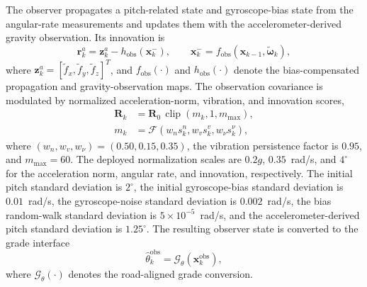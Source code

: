 \documentclass{ieeeaccess}
\begin{document}
The observer propagates a pitch-related state and gyroscope-bias state from the
angular-rate measurements and updates them with the accelerometer-derived
gravity observation. Its innovation is
\begin{equation}
\bm r_k^{a}=\bm z_k^{a}-h_{\mathrm{obs}}(\bm x_k^{-}),
\qquad
\bm x_k^{-}=f_{\mathrm{obs}}(\bm x_{k-1},
\tilde{\bm\omega}_k),
\label{eq:qualified_observer_prediction}
\end{equation}
where $\bm z_k^{a}=[\tilde f_x,\tilde f_y,\tilde f_z]^{T}$, and
$f_{\mathrm{obs}}(\cdot)$ and $h_{\mathrm{obs}}(\cdot)$ denote the
bias-compensated propagation and gravity-observation maps. The observation
covariance is modulated by normalized acceleration-norm, vibration, and
innovation scores,
\begin{equation}
\begin{aligned}
\bm R_k&=\bm R_0\,
\operatorname{clip}\!\left(m_k,1,m_{\max}\right),\\
m_k&=\mathcal F\!\left(
w_n s_k^{n},w_v s_k^{v},w_{\nu}s_k^{\nu}\right),
\end{aligned}
\label{eq:qualified_observer_adaptation}
\end{equation}
where $(w_n,w_v,w_{\nu})=(0.50,0.15,0.35)$, the vibration persistence factor
is $0.95$, and $m_{\max}=60$. The deployed normalization scales are
$0.2g$, $0.35$~rad/s, and $4^{\circ}$ for the acceleration norm, angular
rate, and innovation, respectively. The initial pitch standard deviation is
$2^{\circ}$, the initial gyroscope-bias standard deviation is
$0.01$~rad/s, the gyroscope-noise standard deviation is $0.002$~rad/s, the
bias random-walk standard deviation is $5\times10^{-5}$~rad/s, and the
accelerometer-derived pitch standard deviation is $1.25^{\circ}$. The
resulting observer state is converted to the grade interface
\begin{equation}
\hat\theta_k^{\mathrm{obs}}=\mathcal G_{\theta}(\bm x_k^{\mathrm{obs}}),
\label{eq:qualified_observer_grade_output}
\end{equation}
where $\mathcal G_{\theta}(\cdot)$ denotes the road-aligned grade conversion.
\end{document}
